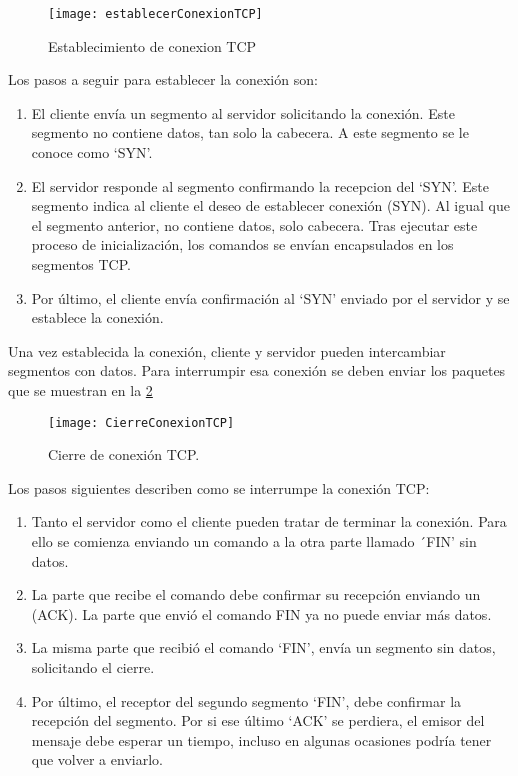 \begin{figure}[!h]
	\centering
	\texttt{[image: establecerConexionTCP]}
	\caption{Establecimiento de conexion TCP }\label{establecimientoConexionTcp}
\end{figure}

Los pasos a seguir para establecer la conexión son:
\begin{enumerate}
\item El cliente envía un segmento al servidor solicitando la conexión. Este segmento no contiene datos, tan solo la cabecera. A este segmento se le conoce como `SYN'.
\item El servidor responde al segmento confirmando  la recepcion del `SYN'. Este segmento indica al cliente el deseo de establecer conexión (SYN). Al igual que el segmento anterior, no contiene datos, solo cabecera.
Tras ejecutar este proceso de inicialización, los comandos se envían encapsulados en los segmentos TCP.
\item Por último, el cliente envía confirmación al `SYN' enviado por el servidor y se establece la conexión.
\end{enumerate}

Una vez establecida la conexión, cliente y servidor pueden intercambiar segmentos con datos. Para interrumpir esa conexión se deben enviar los paquetes que se muestran en la \ref{cierreConexionTcp}

\begin{figure}[!h]
	\centering
	\texttt{[image: CierreConexionTCP]}
	\caption{Cierre de conexión TCP.}\label{cierreConexionTcp}
\end{figure}


Los pasos siguientes describen como se interrumpe la conexión TCP:
\begin{enumerate}
\item Tanto el servidor como el cliente pueden tratar de terminar la conexión. Para ello se comienza enviando un comando a la otra parte llamado ´FIN' sin datos.
\item La parte que recibe el comando debe confirmar su recepción enviando un (ACK). La parte que envió el comando FIN ya no puede enviar más datos. 
\item La misma parte que recibió el comando `FIN', envía un segmento sin datos, solicitando el cierre.
\item Por último, el receptor del segundo segmento `FIN', debe confirmar la recepción del segmento. Por si ese último `ACK' se perdiera, el emisor del mensaje debe esperar un tiempo, incluso en algunas ocasiones podría tener que volver a enviarlo.
\end{enumerate}

